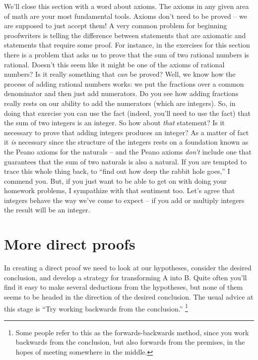 We'll close this section with a word about axioms.  The axioms in any
given area of math are your most fundamental tools.  Axioms don't
need to be proved -- we are supposed to just accept them!  A very common 
problem for beginning proofwriters is telling the difference between statements
that are axiomatic and statements that require some proof.  For instance, in the
exercises for this section there is a problem that asks us to prove that the sum of
two rational numbers is rational.  Doesn't this seem like it might be one of
the axioms of rational numbers?  Is it really something that {\em can} be proved?
Well, we know how the process of adding rational numbers works: we put the
fractions over a common
denominator and then just add numerators.  Do you see how adding fractions really rests
on our ability to add the numerators (which are integers).  So, in doing that exercise you
can use the fact (indeed, you'll need to use the fact) that the sum of two integers is an integer.
So how about {\em that} statement?  Is it necessary to prove that adding integers produces 
an integer?  As a matter of fact it {\em is} necessary since the structure of the integers 
rests on a foundation known as the Peano axioms for the naturals -- and the Peano axioms
{\em don't} include one that guarantees that the sum of two naturals is also a natural.  If you
are tempted to trace this whole thing back, to ``find out how deep the rabbit hole goes,'' I commend
you.   But, if you just want to be able to get on with doing your homework problems, I sympathize 
with that sentiment too.  Let's agree that integers behave the way we've come to expect -- if 
you add or multiply integers the result will be an integer. 

\newpage




\newpage
\section{More direct proofs}
\label{sec:more}

In creating a direct proof we need to look at our hypotheses, consider 
the desired conclusion, and develop a strategy for transforming A into B.
Quite often you'll find it easy to make several deductions from the 
hypotheses, but none of them seems to be headed in the direction of 
the desired conclusion.  The usual advice at this stage is 
``Try working backwards from the conclusion.''
\footnote{Some people refer to this as the forwards-backwards method, since %
you work backwards from the conclusion, but also forwards from the premises, %
in the hopes of meeting somewhere in the middle.}  

